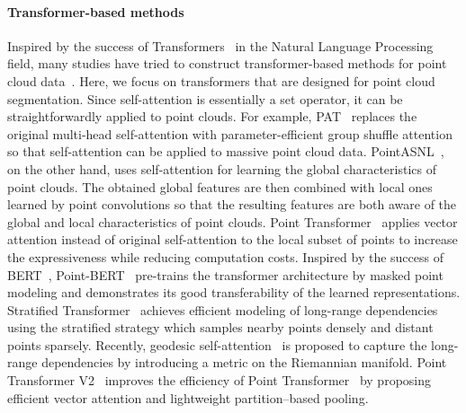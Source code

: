 \documentclass[a4paper,fleqn]{cas-dc}
\begin{document}
\paragraph{Transformer-based methods}
Inspired by the success of Transformers~\cite{vaswani2017attention} in the Natural Language Processing field, many studies have tried to construct transformer-based methods for point cloud data~\cite{liu2021group,qin2022geometric}. Here, we focus on transformers that are designed for point cloud segmentation. Since self-attention is essentially a set operator, it can be straightforwardly applied to point clouds. For example, PAT~\cite{yang2019modeling} replaces the original multi-head self-attention with parameter-efficient group shuffle attention so that self-attention can be applied to massive point cloud data. PointASNL~\cite{yan2020pointasnl}, on the other hand, uses self-attention for learning the global characteristics of point clouds. The obtained global features are then combined with local ones learned by point convolutions so that the resulting features are both aware of the global and local characteristics of point clouds. Point Transformer~\cite{zhao2021point} applies vector attention instead of original self-attention to the local subset of points to increase the expressiveness while reducing computation costs. Inspired by the success of BERT~\cite{devlin2019bert}, Point-BERT~\cite{yu2022point} pre-trains the transformer architecture by masked point modeling and demonstrates its good transferability of the learned representations. Stratified Transformer~\cite{lai2022stratified} achieves efficient modeling of long-range dependencies using the stratified strategy which samples nearby points densely and distant points sparsely. Recently, geodesic self-attention~\cite{ligeodesic2022} is proposed to capture the long-range dependencies by introducing a metric on the Riemannian manifold. Point Transformer V2~\cite{wu2022pointv2} improves the efficiency of Point Transformer~\cite{zhao2021point} by proposing efficient vector attention and lightweight partition--based pooling.     
\end{document}
